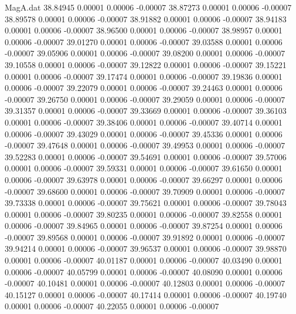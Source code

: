\begin{filecontents}{MagA.dat}
  38.84945    0.00001    0.00006   -0.00007
  38.87273    0.00001    0.00006   -0.00007
  38.89578    0.00001    0.00006   -0.00007
  38.91882    0.00001    0.00006   -0.00007
  38.94183    0.00001    0.00006   -0.00007
  38.96500    0.00001    0.00006   -0.00007
  38.98957    0.00001    0.00006   -0.00007
  39.01270    0.00001    0.00006   -0.00007
  39.03588    0.00001    0.00006   -0.00007
  39.05906    0.00001    0.00006   -0.00007
  39.08200    0.00001    0.00006   -0.00007
  39.10558    0.00001    0.00006   -0.00007
  39.12822    0.00001    0.00006   -0.00007
  39.15221    0.00001    0.00006   -0.00007
  39.17474    0.00001    0.00006   -0.00007
  39.19836    0.00001    0.00006   -0.00007
  39.22079    0.00001    0.00006   -0.00007
  39.24463    0.00001    0.00006   -0.00007
  39.26750    0.00001    0.00006   -0.00007
  39.29059    0.00001    0.00006   -0.00007
  39.31357    0.00001    0.00006   -0.00007
  39.33669    0.00001    0.00006   -0.00007
  39.36103    0.00001    0.00006   -0.00007
  39.38406    0.00001    0.00006   -0.00007
  39.40714    0.00001    0.00006   -0.00007
  39.43029    0.00001    0.00006   -0.00007
  39.45336    0.00001    0.00006   -0.00007
  39.47648    0.00001    0.00006   -0.00007
  39.49953    0.00001    0.00006   -0.00007
  39.52283    0.00001    0.00006   -0.00007
  39.54691    0.00001    0.00006   -0.00007
  39.57006    0.00001    0.00006   -0.00007
  39.59331    0.00001    0.00006   -0.00007
  39.61650    0.00001    0.00006   -0.00007
  39.63978    0.00001    0.00006   -0.00007
  39.66297    0.00001    0.00006   -0.00007
  39.68600    0.00001    0.00006   -0.00007
  39.70909    0.00001    0.00006   -0.00007
  39.73338    0.00001    0.00006   -0.00007
  39.75621    0.00001    0.00006   -0.00007
  39.78043    0.00001    0.00006   -0.00007
  39.80235    0.00001    0.00006   -0.00007
  39.82558    0.00001    0.00006   -0.00007
  39.84965    0.00001    0.00006   -0.00007
  39.87254    0.00001    0.00006   -0.00007
  39.89568    0.00001    0.00006   -0.00007
  39.91892    0.00001    0.00006   -0.00007
  39.94214    0.00001    0.00006   -0.00007
  39.96537    0.00001    0.00006   -0.00007
  39.98870    0.00001    0.00006   -0.00007
  40.01187    0.00001    0.00006   -0.00007
  40.03490    0.00001    0.00006   -0.00007
  40.05799    0.00001    0.00006   -0.00007
  40.08090    0.00001    0.00006   -0.00007
  40.10481    0.00001    0.00006   -0.00007
  40.12803    0.00001    0.00006   -0.00007
  40.15127    0.00001    0.00006   -0.00007
  40.17414    0.00001    0.00006   -0.00007
  40.19740    0.00001    0.00006   -0.00007
  40.22055    0.00001    0.00006   -0.00007

\end{filecontents}
